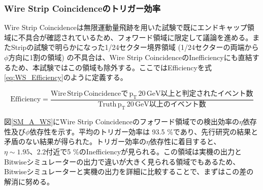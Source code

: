 \subsubsection{Wire Strip Coincidenceのトリガー効率}
Wire Strip Coincidenceは無限運動量飛跡を用いた試験で既にエンドキャップ領域に不具合が確認されているため、フォワード領域に限定して議論を進める。またStripの試験で明らかになった1/24セクター境界領域 (1/24セクターの両端から$\phi$方向に1割の領域) の不具合は、Wire Strip CoincidenceのInefficiencyにも直結するため、本試験ではこの領域も除外する。ここではEfficiencyを式\ref{eq:WS_Efficiency}のように定義する。

\begin{equation}
    \mathrm {Efficiency} = \frac{\mathrm{Wire\,Strip\, Coincidenceで\,p_\mathrm{T} \,20\,GeV以上と判定されたイベント数}}{\mathrm{Truth\,p_\mathrm{T}\,20 \,GeV以上のイベント数}}
    \label{eq:WS_Efficiency}
\end{equation}

図\ref{SM_A_WS}にWire Strip Coincidenceのフォワード領域での検出効率の$\eta$依存性及び$\phi$依存性を示す。平均のトリガー効率は 93.5 \%であり、先行研究\cite{mt_kawamoto}の結果と矛盾のない結果が得られた。トリガー効率の$\eta$依存性に着目すると、$\eta\sim1.95、2.2$付近で5 \%のInefficiencyが見られる。この領域は実機の出力とBitwiseシミュレーターの出力で違いが大きく見られる領域でもあるため、Bitwiseシミュレーターと実機の出力を詳細に比較することで、まずはこの差の解消に努める。

